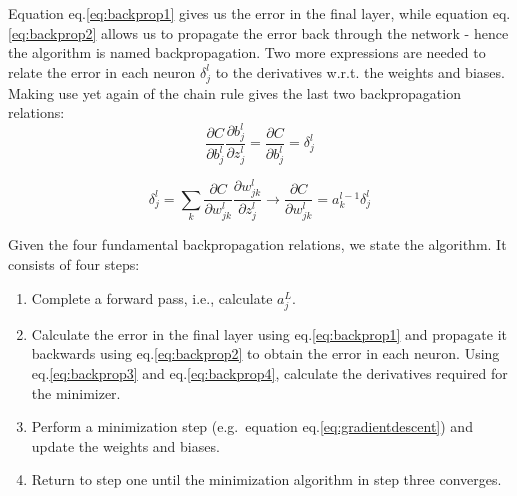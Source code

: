 \documentclass{Dissertate}
\providecommand{\tightlist}{%
  \setlength{\itemsep}{0pt}\setlength{\parskip}{0pt}}
\begin{document}
Equation eq.\ref{eq:backprop1} gives us the error in the final layer,
while equation eq.\ref{eq:backprop2} allows us to propagate the error
back through the network - hence the algorithm is named backpropagation.
Two more expressions are needed to relate the error in each neuron
\(\delta^l_j\) to the derivatives w.r.t. the weights and biases. Making
use yet again of the chain rule gives the last two backpropagation
relations: \begin{equation}
\frac{\partial C}{\partial b^l_{j}}\frac{\partial b^l_{j}}{\partial z^l_{j}}=\frac{\partial C}{\partial b^l_{j}}=\delta^l_j
\label{eq:backprop3}\end{equation}

\begin{equation}
\delta^l_j=\sum_k\frac{\partial C}{\partial w^l_{jk}}\frac{\partial w^l_{jk}}{\partial z^l_{j}}\to \frac{\partial C}{\partial w^l_{jk}}=a^{l-1}_{k}\delta^l_j
\label{eq:backprop4}\end{equation}

Given the four fundamental backpropagation relations, we state the
algorithm. It consists of four steps:

\begin{enumerate}
\def\labelenumi{\arabic{enumi}.}
\tightlist
\item
  Complete a forward pass, i.e., calculate \(a^L_j\).
\item
  Calculate the error in the final layer using eq.\ref{eq:backprop1}
  and propagate it backwards using eq.\ref{eq:backprop2} to obtain the
  error in each neuron. Using eq.\ref{eq:backprop3} and
  eq.\ref{eq:backprop4}, calculate the derivatives required for the
  minimizer.
\item
  Perform a minimization step (e.g.~equation
  eq.\ref{eq:gradientdescent}) and update the weights and biases.
\item
  Return to step one until the minimization algorithm in step three
  converges.
\end{enumerate}
\end{document}
